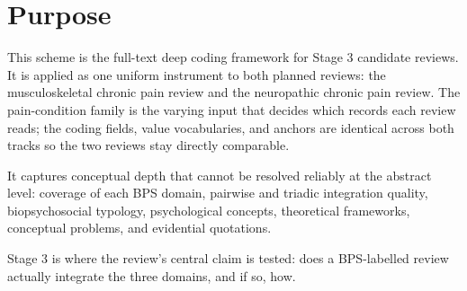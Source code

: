 \documentclass[11pt]{article}
\begin{document}
\section*{Purpose}
This scheme is the full-text deep coding framework for Stage 3 candidate reviews. It is applied as one uniform instrument to both planned reviews: the musculoskeletal chronic pain review and the neuropathic chronic pain review. The pain-condition family is the varying input that decides which records each review reads; the coding fields, value vocabularies, and anchors are identical across both tracks so the two reviews stay directly comparable.

It captures conceptual depth that cannot be resolved reliably at the abstract level: coverage of each BPS domain, pairwise and triadic integration quality, biopsychosocial typology, psychological concepts, theoretical frameworks, conceptual problems, and evidential quotations.

Stage 3 is where the review's central claim is tested: does a BPS-labelled review actually integrate the three domains, and if so, how.
\end{document}
